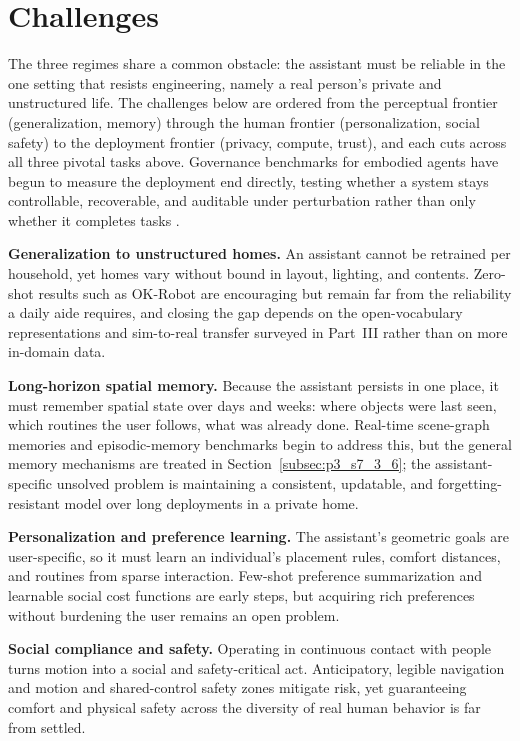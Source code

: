 \section{Challenges}
\label{subsec:p4-sec13-1-challenges}

The three regimes share a common obstacle: the assistant must be reliable in the one setting that resists engineering, namely a real person's private and unstructured life. 
The challenges below are ordered from the perceptual frontier (generalization, memory) through the human frontier (personalization, social safety) to the deployment frontier (privacy, compute, trust), and each cuts across all three pivotal tasks above. 
Governance benchmarks for embodied agents have begun to measure the deployment end directly, testing whether a system stays controllable, recoverable, and auditable under perturbation rather than only whether it completes tasks \cite{qin2026embodiedgovbench}.

\textbf{Generalization to unstructured homes.} An assistant cannot be retrained per household, yet homes vary without bound in layout, lighting, and contents. 
Zero-shot results such as OK-Robot \cite{liu2024okrobot} are encouraging but remain far from the reliability a daily aide requires, and closing the gap depends on the open-vocabulary representations and sim-to-real transfer surveyed in Part~III rather than on more in-domain data.

\textbf{Long-horizon spatial memory.} Because the assistant persists in one place, it must remember spatial state over days and weeks: where objects were last seen, which routines the user follows, what was already done. 
Real-time scene-graph memories \cite{hughes2022hydra} and episodic-memory benchmarks \cite{majumdar2024openeqa} begin to address this, but the general memory mechanisms are treated in Section~\ref{subsec:p3_s7_3_6}; the assistant-specific unsolved problem is maintaining a consistent, updatable, and forgetting-resistant model over long deployments in a private home.

\textbf{Personalization and preference learning.} The assistant's geometric goals are user-specific, so it must learn an individual's placement rules, comfort distances, and routines from sparse interaction. 
Few-shot preference summarization \cite{wu2023tidybot} and learnable social cost functions are early steps, but acquiring rich preferences without burdening the user remains an open problem.

\textbf{Social compliance and safety.} Operating in continuous contact with people turns motion into a social and safety-critical act. 
Anticipatory, legible navigation and motion \cite{trautman2010unfreezing,dragan2013legibility} and shared-control safety zones \cite{ghorbel2018decision} mitigate risk, yet guaranteeing comfort and physical safety across the diversity of real human behavior is far from settled.

